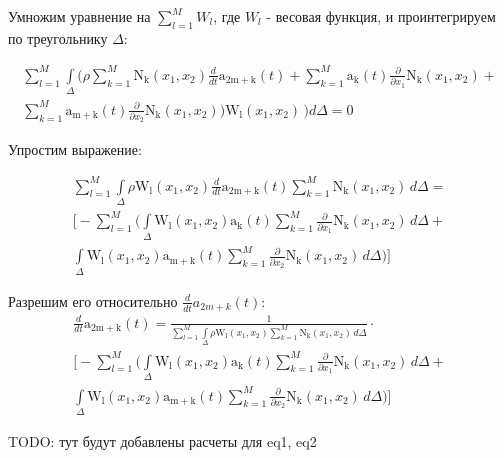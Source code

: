 \documentclass[14pt]{extreport}
\begin{document}
Умножим уравнение на $\sum\limits_{l=1}^{M} W_l$, где $W_l$ - весовая функция, и проинтегрируем по треугольнику $\Delta$:

\begin{multline*}
\sum_{l=1}^{M} \int\limits_{\Delta} \bigg(\rho \sum_{k=1}^{M} \operatorname{N_{k}}{ (x_{1},x_{2}  )} \frac{d}{d t} \operatorname{a_{2m+k}}{ (t  )} + \sum_{k=1}^{M} \operatorname{a_{k}}{ (t  )} \frac{\partial}{\partial x_{1}} \operatorname{N_{k}}{ (x_{1},x_{2}  )} + \\ \sum_{k=1}^{M} \operatorname{a_{m+k}}{ (t  )} \frac{\partial}{\partial x_{2}} \operatorname{N_{k}}{ (x_{1},x_{2}  )}\bigg) \operatorname{W_{l}}{ (x_{1},x_{2}  )}\, \bigg)d\Delta=0
\end{multline*}

Упростим выражение:

\begin{multline*}
\sum_{l=1}^{M} \int\limits_{\Delta} \rho \operatorname{W_{l}}{ (x_{1},x_{2}  )} \frac{d}{d t} \operatorname{a_{2m+k}}{ (t  )} \sum_{k=1}^{M} \operatorname{N_{k}}{ (x_{1},x_{2}  )}\, d\Delta = \\ \bigg [ - \sum_{l=1}^{M} \bigg(\int\limits_{\Delta} \operatorname{W_{l}}{ (x_{1},x_{2}  )} \operatorname{a_{k}}{ (t  )} \sum_{k=1}^{M} \frac{\partial}{\partial x_{1}} \operatorname{N_{k}}{ (x_{1},x_{2}  )}\, d\Delta + \\ \int\limits_{\Delta} \operatorname{W_{l}}{ (x_{1},x_{2}  )} \operatorname{a_{m+k}}{ (t  )} \sum_{k=1}^{M} \frac{\partial}{\partial x_{2}} \operatorname{N_{k}}{ (x_{1},x_{2}  )}\, d\Delta\bigg)\bigg ]
\end{multline*}

Разрешим его относительно $\frac{d}{dt}a_{2m+k}(t)$:
\begin{multline*}
\frac{d}{d t} \operatorname{a_{2m+k}}{ (t  )}= \frac{1}{\sum\limits_{l=1}^{M} \int\limits_{\Delta} \rho \operatorname{W_{l}}{ (x_{1},x_{2}  )}  \sum\limits_{k=1}^{M} \operatorname{N_{k}}{ (x_{1},x_{2}  )}\, d\Delta} \cdot \\ \bigg [ - \sum_{l=1}^{M} \bigg(\int\limits_{\Delta} \operatorname{W_{l}}{ (x_{1},x_{2}  )} \operatorname{a_{k}}{ (t  )} \sum\limits_{k=1}^{M} \frac{\partial}{\partial x_{1}} \operatorname{N_{k}}{ (x_{1},x_{2}  )}\, d\Delta + \\ \int\limits_{\Delta} \operatorname{W_{l}}{ (x_{1},x_{2}  )} \operatorname{a_{m+k}}{ (t  )} \sum_{k=1}^{M} \frac{\partial}{\partial x_{2}} \operatorname{N_{k}}{ (x_{1},x_{2}  )}\, d\Delta\bigg)\bigg ]
\end{multline*}

TODO: тут будут добавлены расчеты для eq1, eq2
\end{document}
